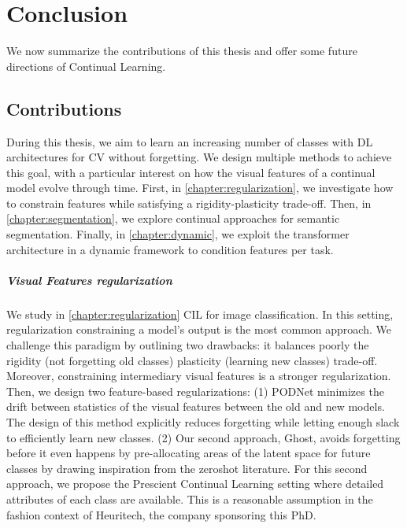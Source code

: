 \chapter{Conclusion}
\label{chapter:conclusion}

{}


We now summarize the contributions of this thesis and offer some future directions of Continual
Learning.

\section{Contributions}

During this thesis, we aim to learn an increasing number of classes with \ac{DL} architectures for
\ac{CV} without forgetting. We design multiple methods to achieve this goal, with a particular
interest on how the visual features of a continual model evolve through time. First, in
\autoref{chapter:regularization}, we investigate how to constrain features while satisfying a
rigidity-plasticity trade-off. Then, in \autoref{chapter:segmentation}, we explore continual
approaches for semantic segmentation. Finally, in \autoref{chapter:dynamic}, we exploit the
transformer architecture in a dynamic framework to condition features per task.

\paragraph{Visual Features regularization} We study in \autoref{chapter:regularization} \ac{CIL} for
image classification. In this setting, regularization constraining a model's output is the most
common approach. We challenge this paradigm by outlining two drawbacks: it balances poorly the
rigidity (not forgetting old classes) \vs plasticity (learning new classes) trade-off. Moreover,
constraining intermediary visual features is a stronger regularization. Then, we design two
feature-based regularizations: (1) PODNet minimizes the drift between statistics of the visual
features between the old and new models. The design of this method explicitly reduces forgetting
while letting enough slack to efficiently learn new classes. (2) Our second approach, Ghost, avoids
forgetting before it even happens by pre-allocating areas of the latent space for future classes by
drawing inspiration from the zeroshot literature. For this second approach, we propose the Prescient
Continual Learning setting where detailed attributes of each class are available. This is a
reasonable assumption in the fashion context of Heuritech, the company sponsoring this PhD.

